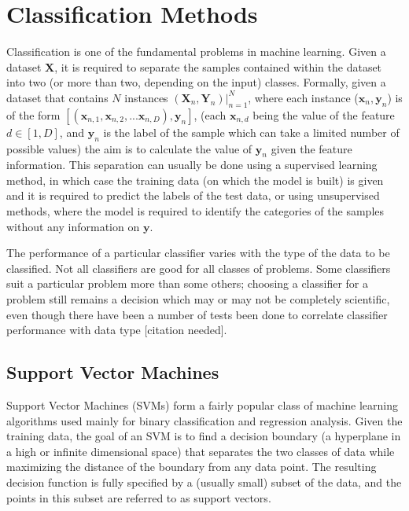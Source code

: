 \chapter{Classification Methods}
\label{chapter:Classification Methods}

Classification is one of the fundamental problems in machine learning. Given a dataset $\mathbf{X}$, it is required to separate the samples contained within the dataset into two (or more than two, depending on the input) classes. Formally, given a dataset that contains $N$ instances $(\mathbf{X}_{n}, \mathbf{Y}_n) |_{n = 1}^{N}$, where each instance ($\mathbf{x}_{n}, \mathbf{y}_{n}$) is of the form $[(\mathbf{x}_{n, 1}, \mathbf{x}_{n, 2}, ... \mathbf{x}_{n, D}), \mathbf{y}_{n}]$, (each $\mathbf{x}_{n, d}$ being the value of the feature $d \in [1, D]$, and $\mathbf{y}_{n}$ is the label of the sample which can take a limited number of possible values) the aim is to calculate the value of $\mathbf{y}_{n}$ given the feature information. This separation can usually be done using a supervised learning method, in which case the training data (on which the model is built) is given and it is required to predict the labels of the test data, or using unsupervised methods, where the model is required to identify the categories of the samples without any information on $\mathbf{y}$.

The performance of a particular classifier varies with the type of the data to be classified. Not all classifiers are good for all classes of problems. Some classifiers suit a particular problem more than some others; choosing a classifier for a problem still remains a decision which may or may not be completely scientific, even though there have been a number of tests been done to correlate classifier performance with data type [citation needed].

\section{Support Vector Machines}
Support Vector Machines (SVMs) form a fairly popular class of machine learning algorithms used mainly for binary classification and regression analysis. Given the training data, the goal of an SVM is to find a decision boundary (a hyperplane in a high or infinite dimensional space) that separates the two classes of data while maximizing the distance of the boundary from any data point. The resulting decision function is fully specified by a (usually small) subset of the data, and the points in this subset are referred to as support vectors.

